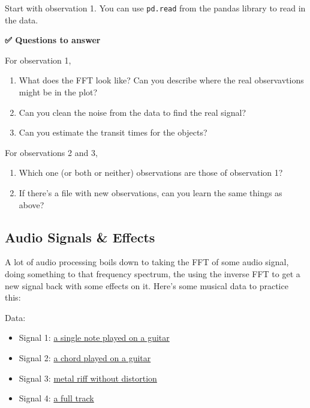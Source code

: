 Start with observation 1. You can use \texttt{pd.read} from the pandas
library to read in the data.

\textbf{✅ Questions to answer}

For observation 1,

\begin{enumerate}
\def\labelenumi{\arabic{enumi}.}
\tightlist
\item
  What does the FFT look like? Can you describe where the real
  observavtions might be in the plot?
\item
  Can you clean the noise from the data to find the real signal?
\item
  Can you estimate the transit times for the objects?
\end{enumerate}

For observations 2 and 3,

\begin{enumerate}
\def\labelenumi{\arabic{enumi}.}
\tightlist
\item
  Which one (or both or neither) observations are those of observation
  1?
\item
  If there's a file with new observations, can you learn the same things
  as above?
\end{enumerate}

\begin{Shaded}
\begin{Highlighting}[]
\end{Highlighting}
\end{Shaded}

\subsection{Audio Signals \& Effects}\label{audio-signals-effects}

A lot of audio processing boils down to taking the FFT of some audio
signal, doing something to that frequency spectrum, the using the
inverse FFT to get a new signal back with some effects on it. Here's
some musical data to practice this:

Data:

\begin{itemize}
\tightlist
\item
  Signal 1:
  \href{https://raw.githubusercontent.com/valentine-alia/phy415fall23/main/content/assets/note.wav}{a
  single note played on a guitar}
\item
  Signal 2:
  \href{https://raw.githubusercontent.com/valentine-alia/phy415fall23/main/content/assets/chord.wav}{a
  chord played on a guitar}
\item
  Signal 3:
  \href{https://raw.githubusercontent.com/valentine-alia/phy415fall23/main/content/assets/riff.wav}{metal
  riff without distortion}
\item
  Signal 4:
  \href{https://raw.githubusercontent.com/valentine-alia/phy415fall23/main/content/assets/track.wav}{a
  full track}
\end{itemize}

